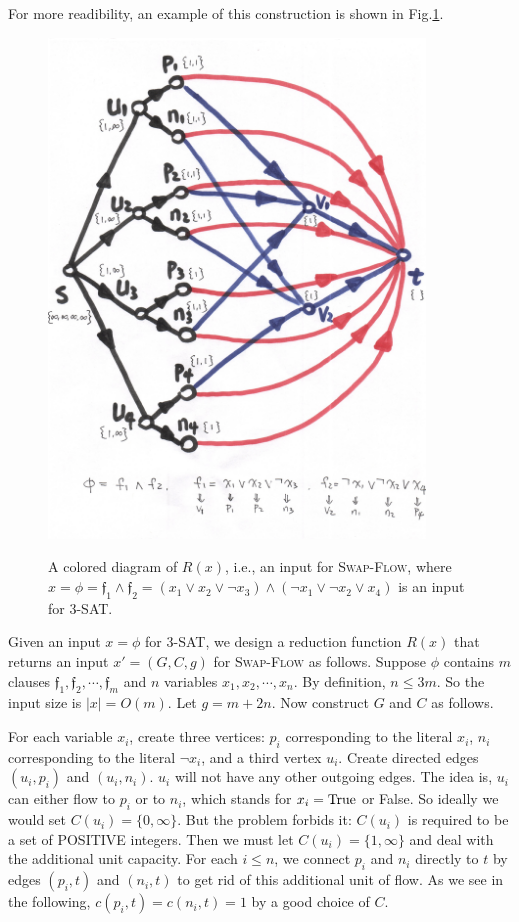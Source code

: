 \documentclass{article}
\begin{document}
For more readibility, an example of this construction is shown in Fig.\ref{example}.
\begin{figure}[!htbp]
	\centering
	\includegraphics[width=10cm]{figure.jpg}\\
	\caption{A colored diagram of $R(x)$, i.e., an input for \textsc{Swap-Flow}, where $x=\phi=\mathfrak{f}_1\wedge\mathfrak{f}_2=(x_1\vee x_2\vee\neg x_3)\wedge(\neg x_1\vee\neg x_2\vee x_4)$ is an input for \textsc{3-SAT}.}
	\label{example}
\end{figure}

Given an input $x=\phi$ for \textsc{3-SAT}, we design a reduction function $R(x)$ that returns an input $x'=(G,C,g)$ for \textsc{Swap-Flow} as follows. Suppose $\phi$ contains $m$ clauses $\mathfrak{f}_1,\mathfrak{f}_2,\cdots,\mathfrak{f}_m$ and $n$ variables $x_1,x_2,\cdots,x_n$. By definition, $n\leqslant 3m$. So the input size is $|x|=O(m)$. Let $g=m+2n$. Now construct $G$ and $C$ as follows.

For each variable $x_i$, create three vertices: $p_i$ corresponding to the literal $x_i$, $n_i$ corresponding to the literal $\neg x_i$, and a third vertex $u_i$. Create directed edges $(u_i,p_i)$ and $(u_i,n_i)$. $u_i$ will not have any other outgoing edges. The idea is, $u_i$ can either flow to $p_i$ or to $n_i$, which stands for $x_i=\textup{True}$ or False. So ideally we would set $C(u_i)=\{0,\infty\}$. But the problem forbids it: $C(u_i)$ is required to be a set of POSITIVE integers. Then we must let $C(u_i)=\{1,\infty\}$ and deal with the additional unit capacity. For each $i\leqslant n$, we connect $p_i$ and $n_i$ directly to $t$ by edges $(p_i,t)$ and $(n_i,t)$ to get rid of this additional unit of flow. As we see in the following, $c(p_i,t)=c(n_i,t)=1$ by a good choice of $C$.
\end{document}
